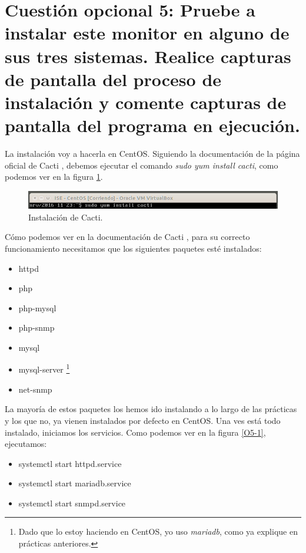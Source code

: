\documentclass[a4paper,titlepage,12pt]{scrartcl}	%
\numberwithin{figure}{section} %
\numberwithin{table}{section} %
\begin{document}
	\section[Cuestión opcional 5: Pruebe a instalar este monitor en alguno de sus tres sistemas. Realice capturas de pantalla del proceso de instalación y comente capturas de pantalla del programa en ejecución.]{Cuestión opcional 5: Pruebe a instalar este monitor en alguno de sus tres sistemas. Realice capturas de pantalla del proceso de instalación y comente capturas de pantalla del programa en ejecución.}
	
	La instalación voy a hacerla en CentOS. Siguiendo la documentación de la página oficial de Cacti \cite{cacti}, debemos ejecutar el comando \textit{sudo yum install cacti}, como podemos ver en la figura \ref{O5-instalacion}.
	
	\begin{figure}[H]
		\includegraphics[width=\linewidth]{./Imagenes/O5-instalacion.png}
		\vspace{-0.5cm}
		\caption[Instalación de Cacti.]{Instalación de Cacti.}
		\label{O5-instalacion}
	\end{figure}
	
	Cómo podemos ver en la  documentación de Cacti \cite{cacti_paquetes}, para su correcto funcionamiento necesitamos que los siguientes paquetes esté instalados: 
	\begin{itemize}
		\item httpd
		\item php
		\item php-mysql
		\item php-snmp
		\item mysql
		\item mysql-server \footnote{Dado que lo estoy haciendo en CentOS, yo uso \textit{mariadb}, como ya explique en prácticas anteriores.}
		\item net-snmp
	\end{itemize}
	
	La mayoría de estos paquetes los hemos ido instalando a lo largo de las prácticas y los que no, ya vienen instalados por defecto en CentOS. Una ves está todo instalado, iniciamos los servicios. Como podemos ver en la figura \ref{O5-1}, ejecutamos:
	\begin{itemize}
		\item systemctl start httpd.service
		\item systemctl start mariadb.service
		\item systemctl start snmpd.service
	\end{itemize}
	
\end{document}
